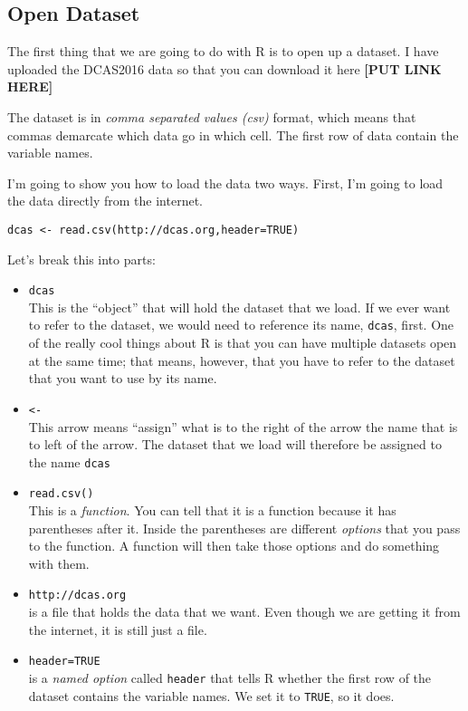 \documentclass[11pt]{lecturenotes}
\newcommand{\code}[1]{\texttt{#1}}
\begin{document}
\subsection[20]{Open Dataset}
The first thing that we are going to do with R is to open up a dataset. I have uploaded the DCAS2016 data so that you can download it here {\bfseries [PUT LINK HERE]}

The dataset is in \emph{comma separated values (csv)} format, which means that commas demarcate which data go in which cell. The first row of data contain the variable names. 

I'm going to show you how to load the data two ways. First, I'm going to load the data directly from the internet. 

\begin{verbatim}
dcas <- read.csv(http://dcas.org,header=TRUE)
\end{verbatim}

Let's break this into parts: 

\begin{itemize}
\item \code{dcas}\\ This is the ``object'' that will hold the dataset that we load. If we ever want to refer to the dataset, we would need to reference its name, \code{dcas}, first.  One of the really cool things about R is that you can have multiple datasets open at the same time; that means, however, that you have to refer to the dataset that you want to use by its name. 
\item \code{<-}\\ This arrow means ``assign'' what is to the right of the arrow the name that is to left of the arrow. The dataset that we load will therefore be assigned to the name \code{dcas}
\item \code{read.csv()} \\
This is a \emph{function}. You can tell that it is a function because it has parentheses after it. Inside the parentheses are different \emph{options} that you pass to the function. A function will then take those options and do something with them. 
\item \code{http://dcas.org}\\
 is a file that holds the data that we want. Even though we are getting it from the internet, it is still just a file. 
\item \code{header=TRUE}\\
 is a \emph{named option} called \code{header} that tells R whether the first row of the dataset contains the variable names. We set it to \code{TRUE}, so it does. 
\end{itemize}
\end{document}
